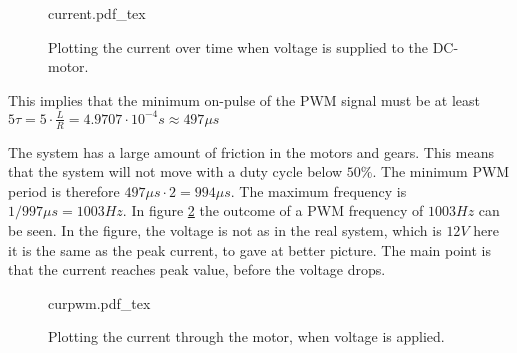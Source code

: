 \documentclass[../../../Main]{subfiles}
\begin{document}
\begin{figure}[H]
\centering
\def\svgwidth{\textwidth}
{current.pdf_tex}
\caption{Plotting the current over time when voltage is supplied to the DC-motor.}
\label{fig:currentplot}
\end{figure}

This implies that the minimum on-pulse of the PWM signal must be at least $5\tau = 5 \cdot \frac{L}{R} = 4.9707 \cdot 10^{-4}s \approx 497\mu s$

The system has a large amount of friction in the motors and gears. This means that the system will not move with a duty cycle below $50\%$. The minimum PWM period is therefore $497\mu s \cdot 2 = 994\mu s$. The maximum frequency is $1/997\mu s = 1003 Hz$.
In figure \ref{fig:currentplot_pwm} the outcome of a PWM frequency of $1003Hz$ can be seen.
In the figure, the voltage is not as in the real system, which is $12V$ here it is the same as the peak current, to gave at better picture. The main point is that the current reaches peak value, before the voltage drops. 

\begin{figure}[H]
\centering
\def\svgwidth{\textwidth}
{curpwm.pdf_tex}
\caption{Plotting the current through the motor, when voltage is applied.}
\label{fig:currentplot_pwm}
\end{figure}
\end{document}
